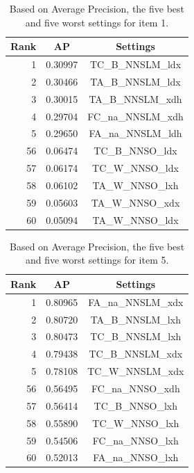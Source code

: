 \begin{table}[htb!]
\begin{center}
\begin{tabular}{|r|c|c|}
\hline
Rank & AP & Settings \\
\hline
\hline
1 & 0.30997 & TC\_B\_NNSLM\_ldx \\
\hline
2 & 0.30466 & TA\_B\_NNSLM\_ldx \\
\hline
3 & 0.30015 & TA\_B\_NNSLM\_xdh \\
\hline
4 & 0.29704 & FC\_na\_NNSLM\_xdh \\
\hline
5 & 0.29650 & FA\_na\_NNSLM\_ldh \\
\hline
\hline
56 & 0.06474 & TC\_B\_NNSO\_ldx \\
\hline
57 & 0.06174 & TC\_W\_NNSO\_ldx \\
\hline
58 & 0.06102 & TA\_W\_NNSO\_lxh \\
\hline
59 & 0.05603 & TA\_W\_NNSO\_xdx \\
\hline
60 & 0.05094 & TA\_W\_NNSO\_ldx \\
\hline
\end{tabular}
\caption{Based on Average Precision, the five best and five worst settings for item 1.}
\label{tab:i01-dist-ranked-settings}
\end{center}
\end{table}

\begin{table}[htb!]
\begin{center}
\begin{tabular}{|r|c|c|}
\hline
Rank & AP & Settings \\
\hline
\hline
1 & 0.80965 & FA\_na\_NNSLM\_xdx \\
\hline
2 & 0.80720 & TA\_B\_NNSLM\_lxh \\
\hline
3 & 0.80473 & TC\_B\_NNSLM\_lxh \\
\hline
4 & 0.79438 & TC\_B\_NNSLM\_xdx \\
\hline
5 & 0.78108 & TC\_W\_NNSLM\_xdx \\
\hline
\hline 
56 & 0.56495 & FC\_na\_NNSO\_xdh \\
\hline
57 & 0.56414 & TC\_B\_NNSO\_lxh \\
\hline
58 & 0.55890 & TC\_W\_NNSO\_lxh \\
\hline
59 & 0.54506 & FC\_na\_NNSO\_lxh \\
\hline
60 & 0.52013 & FA\_na\_NNSO\_lxh \\
\hline
\end{tabular}
\caption{Based on Average Precision, the five best and five worst settings for item 5.}
\label{tab:i05-dist-ranked-settings}
\end{center}
\end{table}

